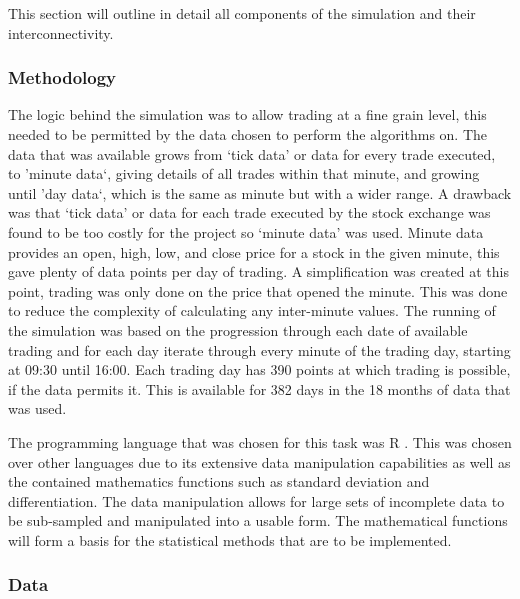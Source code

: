 \documentclass[conference]{IEEEtran}
\begin{document}
This section will outline in detail all components of the simulation and their interconnectivity. \\

\subsubsection{Methodology}

The logic behind the simulation was to allow trading at a fine grain level, this needed to be permitted by the data chosen to perform the algorithms on. The data that was available grows from `tick data' or data for every trade executed, to 'minute data`, giving details of all trades within that minute, and growing until 'day data`, which is the same as minute but with a wider range. A drawback was that `tick data' or data for each trade executed by the stock exchange was found to be too costly for the project so `minute data' was used. Minute data provides an open, high, low, and close price for a stock in the given minute, this gave plenty of data points per day of trading. A simplification was created at this point, trading was only done on the price that opened the minute. This was done to reduce the complexity of calculating any inter-minute values. The running of the simulation was based on the progression through each date of available trading and for each day iterate through every minute of the trading day, starting at 09:30 until 16:00. Each trading day has 390 points at which trading is possible, if the data permits it. This is available for 382 days in the 18 months of data that was used. 

The programming language that was chosen for this task was R \cite{Team2013}. This was chosen over other languages due to its extensive data manipulation capabilities as well as the contained mathematics functions such as standard deviation and differentiation. The data manipulation allows for large sets of incomplete data to be sub-sampled and manipulated into a usable form. The mathematical functions will form a basis for the statistical methods that are to be implemented.

\subsubsection{Data}
\end{document}
